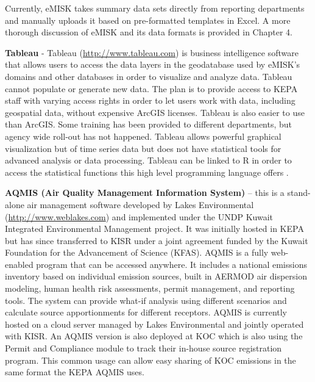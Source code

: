 Currently, eMISK takes summary data sets directly from reporting departments and manually uploads it based on pre-formatted templates in Excel. A more thorough discussion of eMISK and its data formats is provided in Chapter 4.

\textbf{Tableau} - Tableau (\url{http://www.tableau.com}) is business intelligence software that allows users to access the data layers in the geodatabase used by eMISK's domains and other databases in order to visualize and analyze data. Tableau cannot populate or generate new data. The plan is to provide access to KEPA staff with varying access rights in order to let users work with data, including geospatial data, without expensive ArcGIS licenses. Tableau is also easier to use than ArcGIS. Some training has been provided to different departments, but agency wide roll-out has not happened. Tableau allows powerful graphical visualization but of time series data but does not have statistical tools for advanced analysis or data processing. Tableau can be linked to R in order to access the statistical functions this high level programming language offers \citep{tableau2018}. 

\textbf{AQMIS (Air Quality Management Information System)} – this is a stand-alone air management software developed by Lakes Environmental (\url{http://www.weblakes.com}) and implemented under the UNDP Kuwait Integrated Environmental Management project. It was initially hosted in KEPA but has since transferred to KISR under a joint agreement funded by the Kuwait Foundation for the Advancement of Science (KFAS). AQMIS is a fully web-enabled program that can be accessed anywhere. It includes a national emissions inventory based on individual emission sources, built in AERMOD air dispersion modeling, human health risk assessments, permit management, and reporting tools. The system can provide what-if analysis using different scenarios and calculate source apportionments for different receptors. AQMIS is currently hosted on a cloud server managed by Lakes Environmental and jointly operated with KISR. An AQMIS version is also deployed at KOC which is also using the Permit and Compliance module to track their in-house source registration program. This common usage can allow easy sharing of KOC emissions in the same format the KEPA AQMIS uses.

